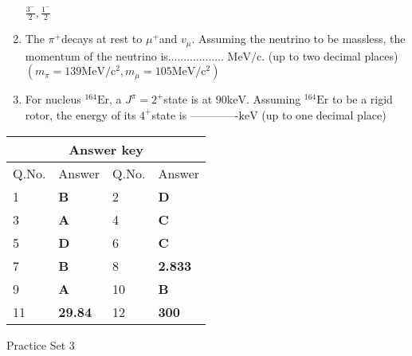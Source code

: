 \begin{enumerate}
\begin{tasks}
		\task[\textbf{D.}] $\frac{3^{-}}{2}, \frac{1^{-}}{2}$
	\end{tasks}
	\item The $\pi^{+}$decays at rest to $\mu^{+}$and $v_{\mu}$. Assuming the neutrino to be massless, the momentum of the neutrino is.................. $\mathrm{MeV} / \mathrm{c}$. (up to two decimal places)\\ $\left(m_{\pi}=139 \mathrm{MeV} / \mathrm{c}^{2}, m_{\mu}=105 \mathrm{MeV} / \mathrm{c}^{2}\right)$
	{}
	\item For nucleus ${ }^{164} \mathrm{Er}$, a $J^{\pi}=2^{+}$state is at $90 \mathrm{keV}$. Assuming ${ }^{164} \mathrm{Er}$ to be a rigid rotor, the energy of its $4^{+}$state is -------------$\mathrm{keV}$ (up to one decimal place)
	{}
\end{enumerate}
\setlength\arrayrulewidth{1pt}
\begin{table}[H]
	\centering
	\begin{tabular}{|p{1.5cm}|p{1.5cm}||p{1.5cm}|p{1.5cm}|}
		\hline
		\multicolumn{4}{|c|}{\textbf{Answer key}}\\\hline\hline
		\rowcolor{ocrel}Q.No.&Answer&Q.No.&Answer\\\hline
		1&\textbf{B} &2&\textbf{D}\\\hline 
		3&\textbf{A} &4&\textbf{C} \\\hline
		5&\textbf{D} &6&\textbf{C} \\\hline
		7&\textbf{B}&8&\textbf{2.833}\\\hline
		9&\textbf{A}&10&\textbf{B}\\\hline
		11&\textbf{29.84} &12&\textbf{300}\\\hline
	\end{tabular}
\end{table}
\newpage
\begin{abox}
	Practice Set 3 
\end{abox}
